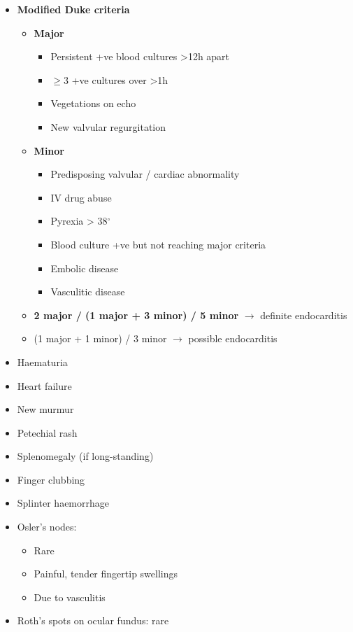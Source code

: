 \documentclass[
  12pt,
]{memoir}
\providecommand{\tightlist}{%
  \setlength{\itemsep}{0pt}\setlength{\parskip}{0pt}}
\begin{document}
\begin{itemize}
\tightlist
\item
  \textbf{Modified Duke criteria}

  \begin{itemize}
  \tightlist
  \item
    \textbf{Major}

    \begin{itemize}
    \tightlist
    \item
      Persistent +ve blood cultures \textgreater12h apart
    \item
      \(\ge 3\) +ve cultures over \textgreater1h
    \item
      Vegetations on echo
    \item
      New valvular regurgitation
    \end{itemize}
  \item
    \textbf{Minor}

    \begin{itemize}
    \tightlist
    \item
      Predisposing valvular / cardiac abnormality
    \item
      IV drug abuse
    \item
      Pyrexia \textgreater{} 38\(^\circ\)
    \item
      Blood culture +ve but not reaching major criteria
    \item
      Embolic disease
    \item
      Vasculitic disease
    \end{itemize}
  \item
    \textbf{2 major / (1 major + 3 minor) / 5 minor} \(\rightarrow\)
    definite endocarditis
  \item
    (1 major + 1 minor) / 3 minor \(\rightarrow\) possible endocarditis
  \end{itemize}
\item
  Haematuria
\item
  Heart failure
\item
  New murmur
\item
  Petechial rash
\item
  Splenomegaly (if long-standing)
\item
  Finger clubbing
\item
  Splinter haemorrhage
\item
  Osler's nodes:

  \begin{itemize}
  \tightlist
  \item
    Rare
  \item
    Painful, tender fingertip swellings
  \item
    Due to vasculitis
  \end{itemize}
\item
  Roth's spots on ocular fundus: rare
\end{itemize}
\end{document}
